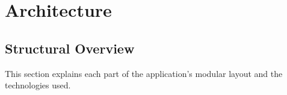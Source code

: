 \pagebreak


\section{Architecture}\label{sec:architecture}

\subsection{Structural Overview}

This section explains each part of the application's modular layout and the technologies used.
